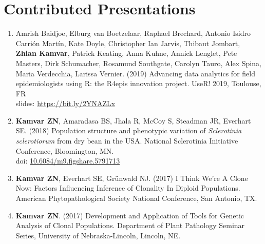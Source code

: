 



\section{Contributed Presentations}


\begin{enumerate}[leftmargin = 14pt]

  \item Amrish Baidjoe, Elburg van Boetzelaar, Raphael Brechard, Antonio Isidro
    Carrión Martín, Kate Doyle, Christopher Ian Jarvis, Thibaut Jombart,
    \textbf{Zhian Kamvar}, Patrick Keating, Anna Kuhne, Annick Lenglet, Pete
    Masters, Dirk Schumacher, Rosamund Southgate, Carolyn Tauro, Alex Spina,
    Maria Verdecchia, Larissa Vernier. (2019) Advancing data analytics for
    field epidemiologists using R: the R4epis innovation project. UseR! 2019,
    Toulouse, FR\\
    slides: \href{https://bit.ly/2YNAZLx}{https://bit.ly/2YNAZLx}

  \vspace{3pt}
    
	\item \textbf{Kamvar ZN}, Amaradasa BS, Jhala R, McCoy S, Steadman JR,
	Everhart SE. (2018) Population structure and phenotypic variation of
	\textit{Sclerotinia sclerotiorum} from dry bean in the USA. National Sclerotinia Initiative Conference, Bloomington, MN.\\
	doi: \href{https://doi.org/10.6084/m9.figshare.5791713}{10.6084/m9.figshare.5791713}

	\vspace{3pt}

	\item \textbf{Kamvar ZN}, Everhart SE, Gr\"unwald NJ. (2017) I Think We're
	A Clone Now: Factors Influencing Inference of Clonality In Diploid
	Populations. American Phytopathological Society National Conference,
	San Antonio, TX.

	\vspace{3pt}

	\item \textbf{Kamvar ZN}. (2017) Development and Application of Tools
	for Genetic Analysis of Clonal Populations. Department of Plant Pathology
	Seminar Series, University of Nebraska-Lincoln, Lincoln, NE.


\end{enumerate}

